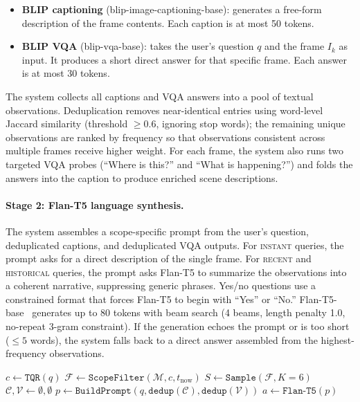 \begin{itemize}[itemsep=2pt]
  \item \textbf{BLIP captioning} (blip-image-captioning-base): generates a free-form description of the frame contents. Each caption is at most 50 tokens.
  \item \textbf{BLIP VQA} (blip-vqa-base): takes the user's question $q$ and the frame $I_k$ as input. It produces a short direct answer for that specific frame. Each answer is at most 30 tokens.
\end{itemize}

The system collects all captions and VQA answers into a pool of textual observations.
Deduplication removes near-identical entries using word-level Jaccard similarity (threshold $\ge 0.6$, ignoring stop words); the remaining unique observations are ranked by frequency so that observations consistent across multiple frames receive higher weight.
For each frame, the system also runs two targeted VQA probes (``Where is this?'' and ``What is happening?'') and folds the answers into the caption to produce enriched scene descriptions.

\paragraph{Stage 2: Flan-T5 language synthesis.}
The system assembles a scope-specific prompt from the user's question, deduplicated captions, and deduplicated VQA outputs.
For \textsc{instant} queries, the prompt asks for a direct description of the single frame.
For \textsc{recent} and \textsc{historical} queries, the prompt asks Flan-T5 to summarize the observations into a coherent narrative, suppressing generic phrases.
Yes/no questions use a constrained format that forces Flan-T5 to begin with ``Yes'' or ``No.''
Flan-T5-base~\cite{chung2022flanT5} generates up to 80 tokens with beam search (4 beams, length penalty 1.0, no-repeat 3-gram constraint).
If the generation echoes the prompt or is too short ($\le 5$ words), the system falls back to a direct answer assembled from the highest-frequency observations.

\begin{algorithm}[t]
\SetAlgoLined
{}
$c \leftarrow \texttt{TQR}(q)$ 
$\mathcal{F} \leftarrow \texttt{ScopeFilter}(\mathcal{M}, c, t_{\text{now}})$\;
$S \leftarrow \texttt{Sample}(\mathcal{F}, K\!=\!6)$\;
$\mathcal{C}, \mathcal{V} \leftarrow \emptyset, \emptyset$\;
$p \leftarrow \texttt{BuildPrompt}(q, \texttt{dedup}(\mathcal{C}), \texttt{dedup}(\mathcal{V}))$\;
$a \leftarrow \texttt{Flan-T5}(p)$\;
\caption{Stream-Fused Generator}
\label{alg:sfg}
\end{algorithm}


